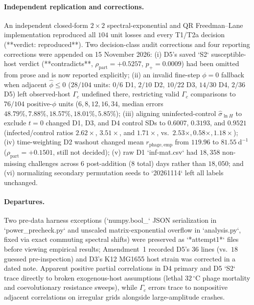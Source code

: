 \paragraph{Independent replication and corrections.}
An independent closed-form $2 \times 2$ spectral-exponential and QR Freedman--Lane implementation reproduced all $104$ unit losses and every T1/T2a decision (**verdict: reproduced**). Two decision-class audit corrections and four reporting corrections were appended on 15 November 2026: (i) D5's saved `S2` susceptible-host verdict (**contradicts**, $\rho_{\mathrm{part}} = +0.5257$, $p_+ = 0.0009$) had been omitted from prose and is now reported explicitly; (ii) an invalid fine-step $\phi = 0$ fallback when adjacent $\hat{\phi} \le 0$ ($28/104$ units: $0/6$ D1, $2/10$ D2, $10/22$ D3, $14/30$ D4, $2/36$ D5) left observed-host $\Gamma_c$ undefined there, restricting valid $\Gamma_c$ comparisons to $76/104$ positive-$\phi$ units ($6, 8, 12, 16, 34$, median errors $48.79\%, 7.88\%, 18.57\%, 18.01\%, 5.85\%$); (iii) aligning uninfected-control $\hat{\sigma}_{\ln H}$ to exclude $t = 0$ changed D1, D3, and D4 control SDs to $0.6007$, $0.3193$, and $0.9521$ (infected/control ratios $2.62\times$, $3.51\times$, and $1.71\times$, vs.\ $2.53\times, 0.58\times, 1.18\times$); (iv) time-weighting D2 washout changed mean $r_{\mathrm{phage,emp}}$ from $119.96$ to $81.55\ \mathrm{d}^{-1}$ ($\rho_{\mathrm{part}} = +0.1501$, still not decided); (v) raw D1 `inf-mat.csv` had $18{,}358$ non-missing challenges across $6$ post-addition ($8$ total) days rather than $18{,}050$; and (vi) normalizing secondary permutation seeds to `20261114` left all labels unchanged.

\paragraph{Departures.}
Two pre-data harness exceptions (`numpy.bool\_` JSON serialization in `power\_precheck.py` and unscaled matrix-exponential overflow in `analysis.py`, fixed via exact commuting spectral shifts) were preserved as `*attempt1*` files before viewing empirical results; Amendment~1 recorded D5's $36$ lines (vs.\ $18$ guessed pre-inspection) and D3's K12 MG1655 host strain was corrected in a dated note. Apparent positive partial correlations in D4 primary and D5 `S2` trace directly to broken exogenous-host assumptions (lethal $32\,^{\circ}\mathrm{C}$ phage mortality and coevolutionary resistance sweeps), while $\Gamma_c$ errors trace to nonpositive adjacent correlations on irregular grids alongside large-amplitude crashes.

